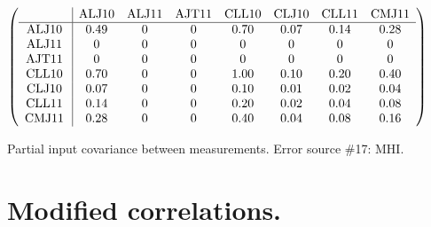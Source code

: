 \begin{table}[H]
\scriptsize
\begin{center}
\renewcommand{\arraystretch}{1.1}
\begin{math}\left(\begin{array}{c|ccccccc}
 & \mathrm{ALJ10} & 
\mathrm{ALJ11} & 
\mathrm{AJT11} & 
\mathrm{CLL10} & 
\mathrm{CLJ10} & 
\mathrm{CLL11} & 
\mathrm{CMJ11} \\
\hline
\mathrm{ALJ10} \hspace*{2pt} &       0.49 &  0 &  0 &       0.70 &       0.07 &       0.14 &       0.28 \\
\mathrm{ALJ11} \hspace*{2pt} &  0 &  0 &  0 &  0 &  0 &  0 &  0 \\
\mathrm{AJT11} \hspace*{2pt} &  0 &  0 &  0 &  0 &  0 &  0 &  0 \\
\mathrm{CLL10} \hspace*{2pt} &       0.70 &  0 &  0 &       1.00 &       0.10 &       0.20 &       0.40 \\
\mathrm{CLJ10} \hspace*{2pt} &       0.07 &  0 &  0 &       0.10 &       0.01 &       0.02 &       0.04 \\
\mathrm{CLL11} \hspace*{2pt} &       0.14 &  0 &  0 &       0.20 &       0.02 &       0.04 &       0.08 \\
\mathrm{CMJ11} \hspace*{2pt} &       0.28 &  0 &  0 &       0.40 &       0.04 &       0.08 &       0.16 \\
\end{array}\right)\end{math}
\caption{Partial input covariance between measurements. Error source \#17: MHI.}
\renewcommand{\arraystretch}{1}
\end{center}
\end{table}
\clearpage
\section{Modified correlations.}
